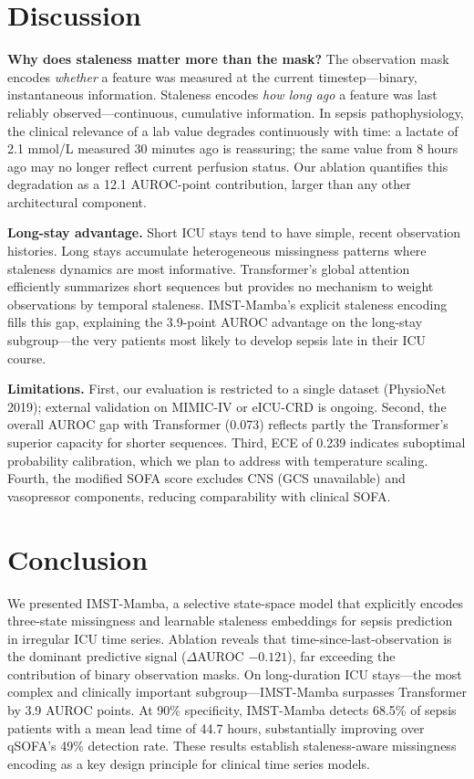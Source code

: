 \documentclass[twoside,11pt]{article}
\begin{document}
\section{Discussion}
\label{sec:discussion}

\textbf{Why does staleness matter more than the mask?}
The observation mask encodes \emph{whether} a feature was measured at the
current timestep—binary, instantaneous information.  Staleness encodes
\emph{how long ago} a feature was last reliably observed—continuous, cumulative
information.  In sepsis pathophysiology, the clinical relevance of a lab value
degrades continuously with time: a lactate of 2.1 mmol/L measured 30 minutes
ago is reassuring; the same value from 8 hours ago may no longer reflect
current perfusion status.  Our ablation quantifies this degradation as a
12.1 AUROC-point contribution, larger than any other architectural component.

\textbf{Long-stay advantage.}
Short ICU stays tend to have simple, recent observation histories.  Long stays
accumulate heterogeneous missingness patterns where staleness dynamics are most
informative.  Transformer's global attention efficiently summarizes short
sequences but provides no mechanism to weight observations by temporal
staleness.  IMST-Mamba's explicit staleness encoding fills this gap, explaining
the 3.9-point AUROC advantage on the long-stay subgroup—the very patients most
likely to develop sepsis late in their ICU course.

\textbf{Limitations.}
First, our evaluation is restricted to a single dataset (PhysioNet 2019);
external validation on MIMIC-IV or eICU-CRD is ongoing.  Second, the overall
AUROC gap with Transformer (0.073) reflects partly the Transformer's superior
capacity for shorter sequences.  Third, ECE of 0.239 indicates suboptimal
probability calibration, which we plan to address with temperature scaling.
Fourth, the modified SOFA score excludes CNS (GCS unavailable) and vasopressor
components, reducing comparability with clinical SOFA.

\section{Conclusion}
\label{sec:conclusion}

We presented IMST-Mamba, a selective state-space model that explicitly encodes
three-state missingness and learnable staleness embeddings for sepsis prediction
in irregular ICU time series.  Ablation reveals that time-since-last-observation
is the dominant predictive signal ($\Delta$AUROC $-0.121$), far exceeding
the contribution of binary observation masks.  On long-duration ICU stays—the
most complex and clinically important subgroup—IMST-Mamba surpasses Transformer
by 3.9 AUROC points.  At 90\% specificity, IMST-Mamba detects 68.5\% of
sepsis patients with a mean lead time of 44.7 hours, substantially improving
over qSOFA's 49\% detection rate.  These results establish staleness-aware
missingness encoding as a key design principle for clinical time series models.

\vskip 0.2in


\end{document}
